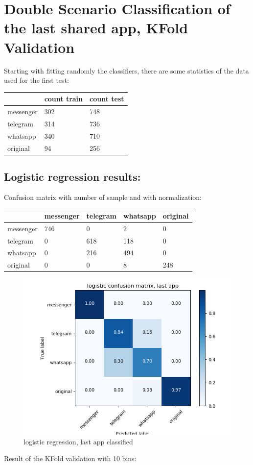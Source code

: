 \chapter{Double Scenario Classification of the last shared app, KFold Validation}Starting with fitting randomly the classifiers, there are some statistics of the data used for the first test: \\
 {\def\arraystretch{1.3} 
 \begin{table}[H] 
\centering 
\begin{tabular}{|l|l|l|} 
\hline 
  &count train  &count test  \\ \hline
messenger  &302  &748  \\ \hline
telegram  &314  &736  \\ \hline
whatsapp  &340  &710  \\ \hline
original  &94  &256  \\ \hline
\end{tabular} 
\end{table} }
\section{Logistic regression results:} 
Confusion matrix with number of sample and with normalization:
 {\def\arraystretch{1.3} 
 \begin{table}[H] 
\centering 
\begin{tabular}{|l|l|l|l|l|} 
\hline 
  &messenger  &telegram  &whatsapp  &original  \\ \hline
messenger  &746  &0  &2  &0  \\ \hline
telegram  &0  &618  &118  &0  \\ \hline
whatsapp  &0  &216  &494  &0  \\ \hline
original  &0  &0  &8  &248  \\ \hline
\end{tabular} 
\end{table} }

 \begin{figure}[H] 
\centering 
\includegraphics[scale=.6]{images/new_met_lr_initial_double_simple.png} 
\caption{logistic regression, last app classified} 
\end{figure} 


Result of the KFold validation with 10 bins:
